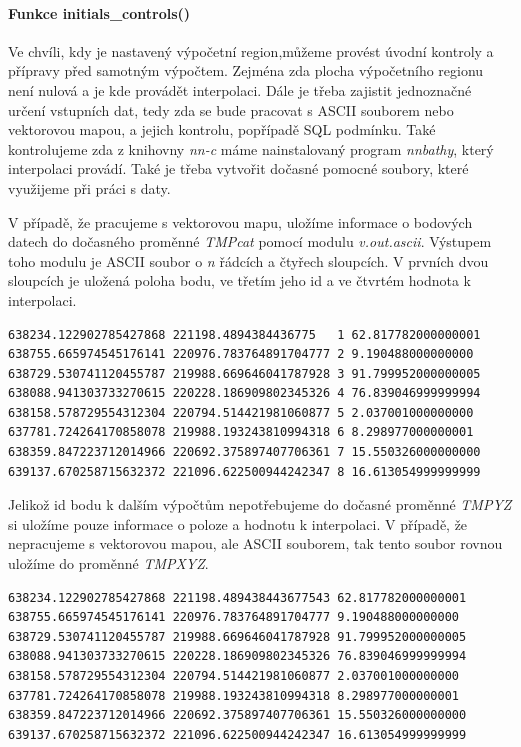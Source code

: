 \documentclass[12pt,a4paper]{article}
\begin{document}
\bigskip
\paragraph{Funkce initials\_controls()}
Ve chvíli, kdy je nastavený výpočetní region,můžeme provést úvodní kontroly a přípravy před samotným výpočtem. Zejména zda plocha výpočetního regionu není nulová a je kde provádět interpolaci. Dále je třeba zajistit jednoznačné určení vstupních dat, tedy zda se bude pracovat s ASCII souborem nebo vektorovou mapou, a jejich kontrolu, popřípadě SQL podmínku. Také kontrolujeme zda z knihovny \textit{nn-c} máme nainstalovaný program \textit{nnbathy}, který interpolaci provádí. Také je třeba vytvořit dočasné pomocné soubory, které využijeme při práci s daty. 

V případě, že pracujeme s vektorovou mapu, uložíme informace o bodových datech do dočasného proměnné \textit{TMPcat} pomocí modulu \textit{v.out.ascii}. Výstupem toho modulu je ASCII soubor o \textit{n} řádcích a čtyřech sloupcích. V prvních dvou sloupcích je uložená poloha bodu, ve třetím jeho id a ve čtvrtém hodnota k interpolaci. 

\bigskip
\lstset{basicstyle=\footnotesize}
\begin{lstlisting}[caption={Pomocný soubor TMPcat}]
638234.122902785427868 221198.4894384436775   1 62.817782000000001
638755.665974545176141 220976.783764891704777 2 9.190488000000000
638729.530741120455787 219988.669646041787928 3 91.799952000000005
638088.941303733270615 220228.186909802345326 4 76.839046999999994
638158.578729554312304 220794.514421981060877 5 2.037001000000000
637781.724264170858078 219988.193243810994318 6 8.298977000000001
638359.847223712014966 220692.375897407706361 7 15.550326000000000
639137.670258715632372 221096.622500944242347 8 16.613054999999999
\end{lstlisting}

Jelikož id bodu k dalším výpočtům nepotřebujeme do dočasné proměnné \textit{TMPYZ} si uložíme pouze informace o poloze a hodnotu k interpolaci. V případě, že nepracujeme s vektorovou mapou, ale ASCII souborem, tak tento soubor rovnou uložíme do proměnné \textit{TMPXYZ}.

\bigskip
\lstset{basicstyle=\footnotesize}
\begin{lstlisting}[caption={Pomocný soubor TMPXYZ}]
638234.122902785427868 221198.489438443677543 62.817782000000001
638755.665974545176141 220976.783764891704777 9.190488000000000
638729.530741120455787 219988.669646041787928 91.799952000000005
638088.941303733270615 220228.186909802345326 76.839046999999994
638158.578729554312304 220794.514421981060877 2.037001000000000
637781.724264170858078 219988.193243810994318 8.298977000000001
638359.847223712014966 220692.375897407706361 15.550326000000000
639137.670258715632372 221096.622500944242347 16.613054999999999
\end{lstlisting}
\end{document}
